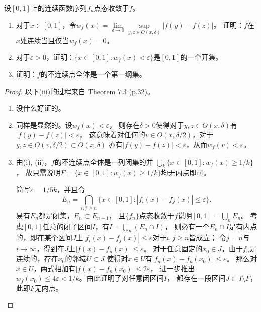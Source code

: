 \begin{7}
    设$[0,1]$上的连续函数序列$f_n$点态收敛于$f$。
    \begin{enumerate}[label=(\roman*)]
        \item 对于$x\in[0,1]$，令$w_f(x)=\lim\limits_{\delta\to0}\sup\limits_{y,z\in O(x,\delta)}|f(y)-f(z)|$。
        证明：$f$在$x$处连续当且仅当$w_f(x)=0$。
        \item 对于$\varepsilon>0$，证明：$\{x\in[0,1]:w_f(x)<\varepsilon\}$是$[0,1]$的一个开集。
        \item 证明：$f$的不连续点全体是一个第一纲集。
    \end{enumerate}
\end{7}
\begin{proof}
    以下(iii)的过程来自\cite{Ox} Theorem 7.3 (p.32)。
    \begin{enumerate}[label=(\roman*)]
        \item 没什么好证的。
        \item 同样是显然的。设$w_f(x)<\varepsilon$，
        则存在$\delta>0$使得对于$y,z \in O(x,\delta)$有$|f(y)-f(z)|<\varepsilon$，
        这意味着对任何的$v \in O(x,\delta/2)$，对于$y,z \in O(v,\delta/2) \subset O(x,\delta)$
        亦有$|f(y)-f(z)|<\varepsilon$，从而$w_f(v)<\varepsilon$。
        \item 由(i), (ii)，$f$的不连续点全体是一列闭集的并
        $\bigcup\limits_{k}\{x\in[0,1]:w_f(x)\geqslant1/k\}$，
        故只需说明$F=\{x\in[0,1]:w_f(x)\geqslant1/k\}$均无内点即可。

        简写$\varepsilon=1/5k$，并且令
        \[E_n=\bigcap_{i,j \geqslant n}\{x\in[0,1]:|f_i(x)-f_j(x)|\leqslant\varepsilon\}.\]
        易有$E_n$都是闭集，$E_n \subset E_{n+1}$，
        且$\{f_n\}$点态收敛于$f$说明$[0,1]=\bigcup\limits_{n}E_n$。
        考虑$[0,1]$任意的闭子区间$I$，有$I=\bigcup\limits_{n}(E_n \cap I)$，
        则必有一个$E_n \cap I$是有内点的，即在某个区间$J$上$|f_i(x)-f_j(x)|\leqslant\varepsilon$对于$i,j \geqslant n$皆成立；
        令$j=n$与$i\to\infty$，得到在$J$上$|f(x)-f_n(x)|\leqslant\varepsilon$。
        对于任意固定的$x_0 \in J$，由于$f_n$是连续的，存在$x_0$的邻域$U \subset J$
        使得对$x \in U$有$|f_n(x)-f_n(x_0)|\leqslant\varepsilon$。
        那么对$x \in U$，两式相加有$|f(x)-f_n(x_0)|\leqslant2\varepsilon$，
        进一步推出$w_f(x_0)\leqslant4\varepsilon<1/k$。由此证明了对任意闭区间$I$，
        都存在一段区间$J \subset I \setminus F$，此即$F$无内点。\qedhere
    \end{enumerate}
\end{proof}

